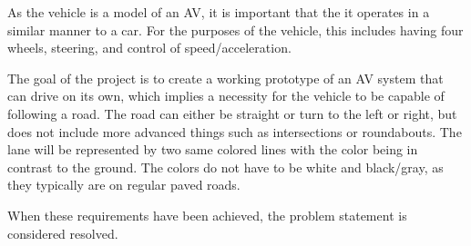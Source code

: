 As the vehicle is a model of an AV, it is important that the it operates in a similar manner to a car.
For the purposes of the vehicle, this includes having four wheels, steering, and control of speed/acceleration.

The goal of the project is to create a working prototype of an AV system that can drive on its own, which implies a necessity for the vehicle to be capable of following a road.
The road can either be straight or turn to the left or right, but does not include more advanced things such as intersections or roundabouts.
The lane will be represented by two same colored lines with the color being in contrast to the ground.
The colors do not have to be white and black/gray, as they typically are on regular paved roads.

When these requirements have been achieved, the problem statement is considered resolved.
